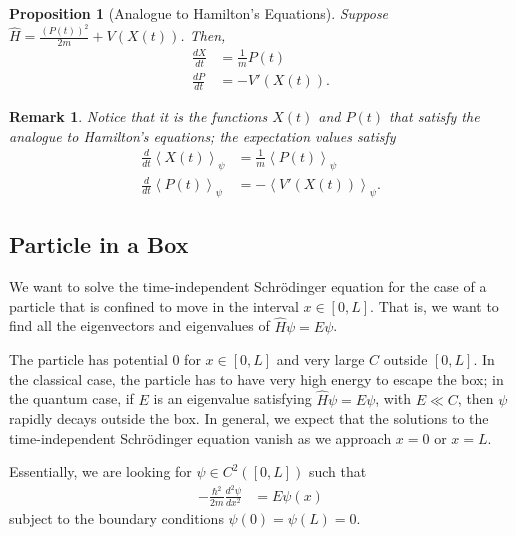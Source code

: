 \documentclass[12pt]{extarticle}
\newtheorem*{remark}{Remark}
\theoremstyle{plain}
\newtheorem*{proposition}{Proposition}%
\theoremstyle{definition}
\theoremstyle{remark}
\renewcommand{\newline}{\hfill\break}
\begin{document}
  \begin{proposition}[Analogue to Hamilton's Equations]
    Suppose $\hat{H} = \frac{\left(P(t)\right)^2}{2m} + V\left(X(t)\right)$. Then,
    \begin{align*}
      \frac{dX}{dt} &= \frac{1}{m}P(t)\\
      \frac{dP}{dt} &= -V'(X(t)).
    \end{align*}
  \end{proposition}
  \begin{remark}
    Notice that it is the functions $X(t)$ and $P(t)$ that satisfy the analogue to Hamilton's equations; the expectation values satisfy
    \begin{align*}
      \frac{d}{dt}\left\langle X(t)\right\rangle_{\psi} &= \frac{1}{m}\left\langle P(t)\right\rangle_{\psi}\\
      \frac{d}{dt}\left\langle P(t)\right\rangle_{\psi} &= -\left\langle V'(X(t))\right\rangle_{\psi}.
    \end{align*}
  \end{remark}
  \subsection{Particle in a Box}%
  We want to solve the time-independent Schrödinger equation for the case of a particle that is confined to move in the interval $x\in [0,L]$. That is, we want to find all the eigenvectors and eigenvalues of $\hat{H}\psi = E\psi$. \newline

  The particle has potential $0$ for $x\in [0,L]$ and very large $C$ outside $[0,L]$. In the classical case, the particle has to have very high energy to escape the box; in the quantum case, if $E$ is an eigenvalue satisfying $\hat{H}\psi = E\psi$, with $E \ll C$, then $\psi$ rapidly decays outside the box. In general, we expect that the solutions to the time-independent Schrödinger equation vanish as we approach $x = 0$ or $x=L$.\newline

  Essentially, we are looking for $\psi \in C^{2}([0,L])$ such that
  \begin{align*}
    -\frac{\hbar^2}{2m}\frac{d^2\psi}{dx^2} &= E\psi(x)
  \end{align*}
  subject to the boundary conditions $\psi(0) = \psi(L) = 0$.\newline
\end{document}

